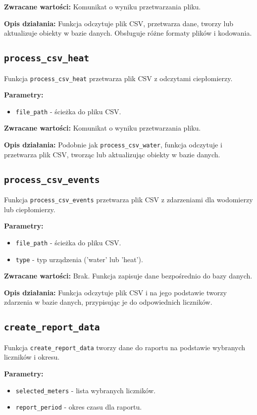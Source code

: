 \documentclass[12pt,a4paper]{report}
\begin{document}
\textbf{Zwracane wartości:} Komunikat o wyniku przetwarzania pliku.

\textbf{Opis działania:}
Funkcja odczytuje plik CSV, przetwarza dane, tworzy lub aktualizuje obiekty w bazie danych. Obsługuje różne formaty plików i kodowania.

\subsection{\texttt{process\_csv\_heat}}
Funkcja \texttt{process\_csv\_heat} przetwarza plik CSV z odczytami ciepłomierzy.

\textbf{Parametry:}
\begin{itemize}
    \item \texttt{file\_path} - ścieżka do pliku CSV.
\end{itemize}

\textbf{Zwracane wartości:} Komunikat o wyniku przetwarzania pliku.

\textbf{Opis działania:}
Podobnie jak \texttt{process\_csv\_water}, funkcja odczytuje i przetwarza plik CSV, tworząc lub aktualizując obiekty w bazie danych.

\subsection{\texttt{process\_csv\_events}}
Funkcja \texttt{process\_csv\_events} przetwarza plik CSV z zdarzeniami dla wodomierzy lub ciepłomierzy.

\textbf{Parametry:}
\begin{itemize}
    \item \texttt{file\_path} - ścieżka do pliku CSV.
    \item \texttt{type} - typ urządzenia ('water' lub 'heat').
\end{itemize}

\textbf{Zwracane wartości:} Brak. Funkcja zapisuje dane bezpośrednio do bazy danych.

\textbf{Opis działania:}
Funkcja odczytuje plik CSV i na jego podstawie tworzy zdarzenia w bazie danych, przypisując je do odpowiednich liczników.

\subsection{\texttt{create\_report\_data}}
Funkcja \texttt{create\_report\_data} tworzy dane do raportu na podstawie wybranych liczników i okresu.

\textbf{Parametry:}
\begin{itemize}
    \item \texttt{selected\_meters} - lista wybranych liczników.
    \item \texttt{report\_period} - okres czasu dla raportu.
\end{itemize}
\end{document}
